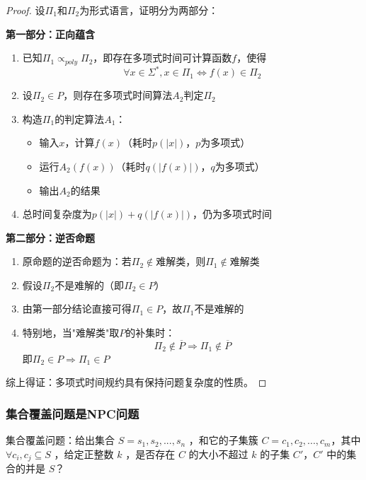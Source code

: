\documentclass[./../main.tex]{subfiles}
\begin{document}
\begin{proof}
设$\Pi_1$和$\Pi_2$为形式语言，证明分为两部分：

\noindent\textbf{第一部分：正向蕴含}
\begin{enumerate}
    \item 已知$\Pi_1 \propto_{poly} \Pi_2$，即存在多项式时间可计算函数$f$，使得
    $$\forall x \in \Sigma^*, x \in \Pi_1 \Leftrightarrow f(x) \in \Pi_2$$
    
    \item 设$\Pi_2 \in P$，则存在多项式时间算法$A_2$判定$\Pi_2$
    
    \item 构造$\Pi_1$的判定算法$A_1$：
    \begin{itemize}
        \item 输入$x$，计算$f(x)$（耗时$p(|x|)$，$p$为多项式）
        \item 运行$A_2(f(x))$（耗时$q(|f(x)|)$，$q$为多项式）
        \item 输出$A_2$的结果
    \end{itemize}
    
    \item 总时间复杂度为$p(|x|)+q(|f(x)|)$，仍为多项式时间
\end{enumerate}

\noindent\textbf{第二部分：逆否命题}
\begin{enumerate}
    \item 原命题的逆否命题为：若$\Pi_2 \notin \text{难解类}$，则$\Pi_1 \notin \text{难解类}$
    
    \item 假设$\Pi_2$不是难解的（即$\Pi_2 \in P$）
    
    \item 由第一部分结论直接可得$\Pi_1 \in P$，故$\Pi_1$不是难解的
    
    \item 特别地，当"难解类"取$P$的补集时：
    $$\Pi_2 \notin \overline{P} \Rightarrow \Pi_1 \notin \overline{P}$$
    即$\Pi_2 \in P \Rightarrow \Pi_1 \in P$
\end{enumerate}

综上得证：多项式时间规约具有保持问题复杂度的性质。
\end{proof}

\subsubsection{集合覆盖问题是NPC问题}

集合覆盖问题：给出集合 $S={s_1,s_2,...,s_n}$ ，和它的子集簇 $C={c_1,c_2,...,c_m}$，其中 $\forall c_i,c_j\subseteq S$ ，给定正整数 $k$ ，是否存在 $C$ 的大小不超过 $k$ 的子集 $C'$，$C'$ 中的集合的并是 $S$？
\end{document}

